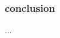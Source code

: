 \documentclass[presentation.tex]{subfiles}
\begin{document}
	
	\begin{frame}
		\frametitle{conclusion}
		...
	\end{frame}
	
\end{document}
